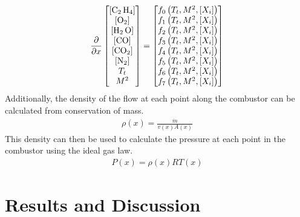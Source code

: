 \documentclass[a4paper]{article}
\begin{document}
\begin{align}
    \frac{\partial}{\partial x} 
    \begin{bmatrix}
    \left[ \ce{C_2 H_4} \right] \\
    \left[ \ce{O_2} \right] \\
    \left[ \ce{H_2 O} \right] \\
    \left[ \ce{CO} \right] \\
    \left[ \ce{CO_2} \right] \\
    \left[ \ce{N_2} \right] \\
    T_t\\
    M^2
    \end{bmatrix}
    =
    \begin{bmatrix}
        f_0 \left(T_t, M^2, \left[ X_i \right]\right)\\
        f_1 \left(T_t, M^2, \left[ X_i \right]\right)\\
        f_2 \left(T_t, M^2, \left[ X_i \right]\right)\\
        f_3 \left(T_t, M^2, \left[ X_i \right]\right)\\
        f_4 \left(T_t, M^2, \left[ X_i \right]\right)\\
        f_5 \left(T_t, M^2, \left[ X_i \right]\right)\\
        f_6 \left(T_t, M^2, \left[ X_i \right]\right)\\
        f_7 \left(T_t, M^2, \left[ X_i \right]\right)
    \end{bmatrix}
\end{align}
Additionally, the density of the flow at each point along the combustor can be calculated from conservation of mass.
\begin{align}
    \rho(x) = \frac{\dot{m}}{v(x) A(x)}
\end{align}
This density can then be used to calculate the pressure at each point in the combustor using the ideal gas law.
\begin{align}
    P(x) = \rho(x) R T(x)
\end{align}

\section{Results and Discussion}
\end{document}

